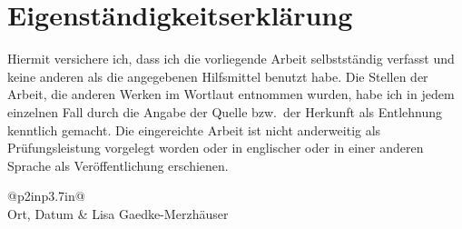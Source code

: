 \documentclass[../draft_1.tex]{subfiles}
\begin{document}
$\quad$
	
\section*{Eigenst\"andigkeitserkl\"arung}


\vspace{1.5cm}
Hiermit versichere ich, dass ich die vorliegende Arbeit selbstst\"andig verfasst und keine anderen als die angegebenen Hilfsmittel benutzt habe. Die Stellen der Arbeit, die anderen Werken im Wortlaut entnommen wurden, habe ich in jedem einzelnen Fall durch die Angabe der Quelle bzw.\ der Herkunft als Entlehnung kenntlich gemacht. Die eingereichte Arbeit ist nicht anderweitig als Pr\"ufungsleistung vorgelegt worden oder in englischer oder in einer anderen Sprache als Ver\"offentlichung erschienen.
\vspace{1.5cm}



\begin{tabular}{@{}p{2in}p{3.7in}@{}}
	 \\
	Ort, Datum & Lisa Gaedke-Merzh\"auser \\
\end{tabular}
\end{document}

